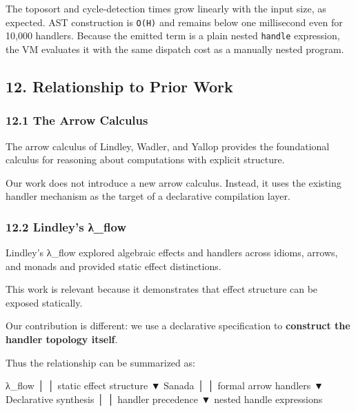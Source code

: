 \documentclass[
  11pt,
]{article}
\newenvironment{Shaded}{}{}
\newcommand{\NormalTok}[1]{#1}
\begin{document}
The toposort and cycle-detection times grow linearly with the input
size, as expected. AST construction is \texttt{O(\textbar{}H\textbar{})}
and remains below one millisecond even for 10,000 handlers. Because the
emitted term is a plain nested \texttt{handle} expression, the VM
evaluates it with the same dispatch cost as a manually nested program.

\subsection{12. Relationship to Prior
Work}\label{relationship-to-prior-work}

\subsubsection{12.1 The Arrow Calculus}\label{the-arrow-calculus}

The arrow calculus of Lindley, Wadler, and Yallop provides the
foundational calculus for reasoning about computations with explicit
structure.

Our work does not introduce a new arrow calculus. Instead, it uses the
existing handler mechanism as the target of a declarative compilation
layer.

\subsubsection{12.2 Lindley's λ\_flow}\label{lindleys-ux3bb_flow}

Lindley's λ\_flow explored algebraic effects and handlers across idioms,
arrows, and monads and provided static effect distinctions.

This work is relevant because it demonstrates that effect structure can
be exposed statically.

Our contribution is different: we use a declarative specification to
\textbf{construct the handler topology itself}.

Thus the relationship can be summarized as:

\begin{Shaded}
\begin{Highlighting}[]
\NormalTok{λ\_flow}
\NormalTok{  │}
\NormalTok{  │ static effect structure}
\NormalTok{  ▼}
\NormalTok{Sanada}
\NormalTok{  │}
\NormalTok{  │ formal arrow handlers}
\NormalTok{  ▼}
\NormalTok{Declarative synthesis}
\NormalTok{  │}
\NormalTok{  │ handler precedence}
\NormalTok{  ▼}
\NormalTok{nested handle expressions}
\end{Highlighting}
\end{Shaded}
\end{document}

